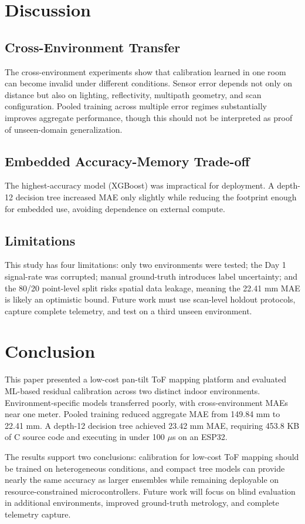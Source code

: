 \documentclass[conference, a4paper]{IEEEtran}
\begin{document}
\section{Discussion}

\subsection{Cross-Environment Transfer}
The cross-environment experiments show that calibration learned in one room can become invalid under different conditions. Sensor error depends not only on distance but also on lighting, reflectivity, multipath geometry, and scan configuration. Pooled training across multiple error regimes substantially improves aggregate performance, though this should not be interpreted as proof of unseen-domain generalization.

\subsection{Embedded Accuracy-Memory Trade-off}
The highest-accuracy model (XGBoost) was impractical for deployment. A depth-12 decision tree increased MAE only slightly while reducing the footprint enough for embedded use, avoiding dependence on external compute.

\subsection{Limitations}
This study has four limitations: only two environments were tested; the Day 1 signal-rate was corrupted; manual ground-truth introduces label uncertainty; and the 80/20 point-level split risks spatial data leakage, meaning the 22.41 mm MAE is likely an optimistic bound. Future work must use scan-level holdout protocols, capture complete telemetry, and test on a third unseen environment.

\section{Conclusion}
This paper presented a low-cost pan-tilt ToF mapping platform and evaluated ML-based residual calibration across two distinct indoor environments. Environment-specific models transferred poorly, with cross-environment MAEs near one meter. Pooled training reduced aggregate MAE from 149.84 mm to 22.41 mm. A depth-12 decision tree achieved 23.42 mm MAE, requiring 453.8 KB of C source code and executing in under 100 $\mu$s on an ESP32.

The results support two conclusions: calibration for low-cost ToF mapping should be trained on heterogeneous conditions, and compact tree models can provide nearly the same accuracy as larger ensembles while remaining deployable on resource-constrained microcontrollers. Future work will focus on blind evaluation in additional environments, improved ground-truth metrology, and complete telemetry capture.



\end{document}

